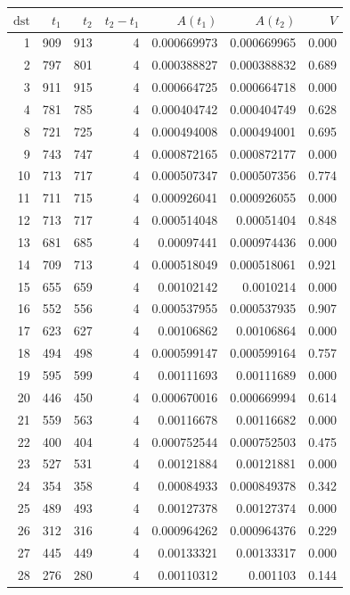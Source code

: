 \begin{tabular}{r r r r r r r}
\toprule
$\mathrm{dst}$ & $t_1$ & $t_2$ & $t_2-t_1$ & $A(t_1)$ & $A(t_2)$ & $V$ \\
\midrule
1 & 909 & 913 & 4 & 0.000669973 & 0.000669965 & 0.000 \\
2 & 797 & 801 & 4 & 0.000388827 & 0.000388832 & 0.689 \\
3 & 911 & 915 & 4 & 0.000664725 & 0.000664718 & 0.000 \\
4 & 781 & 785 & 4 & 0.000404742 & 0.000404749 & 0.628 \\
8 & 721 & 725 & 4 & 0.000494008 & 0.000494001 & 0.695 \\
9 & 743 & 747 & 4 & 0.000872165 & 0.000872177 & 0.000 \\
10 & 713 & 717 & 4 & 0.000507347 & 0.000507356 & 0.774 \\
11 & 711 & 715 & 4 & 0.000926041 & 0.000926055 & 0.000 \\
12 & 713 & 717 & 4 & 0.000514048 & 0.00051404 & 0.848 \\
13 & 681 & 685 & 4 & 0.00097441 & 0.000974436 & 0.000 \\
14 & 709 & 713 & 4 & 0.000518049 & 0.000518061 & 0.921 \\
15 & 655 & 659 & 4 & 0.00102142 & 0.0010214 & 0.000 \\
16 & 552 & 556 & 4 & 0.000537955 & 0.000537935 & 0.907 \\
17 & 623 & 627 & 4 & 0.00106862 & 0.00106864 & 0.000 \\
18 & 494 & 498 & 4 & 0.000599147 & 0.000599164 & 0.757 \\
19 & 595 & 599 & 4 & 0.00111693 & 0.00111689 & 0.000 \\
20 & 446 & 450 & 4 & 0.000670016 & 0.000669994 & 0.614 \\
21 & 559 & 563 & 4 & 0.00116678 & 0.00116682 & 0.000 \\
22 & 400 & 404 & 4 & 0.000752544 & 0.000752503 & 0.475 \\
23 & 527 & 531 & 4 & 0.00121884 & 0.00121881 & 0.000 \\
24 & 354 & 358 & 4 & 0.00084933 & 0.000849378 & 0.342 \\
25 & 489 & 493 & 4 & 0.00127378 & 0.00127374 & 0.000 \\
26 & 312 & 316 & 4 & 0.000964262 & 0.000964376 & 0.229 \\
27 & 445 & 449 & 4 & 0.00133321 & 0.00133317 & 0.000 \\
28 & 276 & 280 & 4 & 0.00110312 & 0.001103 & 0.144 \\

\end{tabular}
